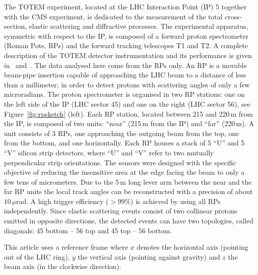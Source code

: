 The TOTEM experiment, located at the LHC Interaction Point (IP) 5 together with
the CMS experiment, is dedicated to the measurement of the total 
cross-section, elastic scattering
and diffractive processes. The experimental
apparatus, symmetric with respect to the IP, is 
composed of a forward proton spectrometer (Roman Pots, RPs) and the 
forward tracking telescopes T1 and T2. 
A complete description of the TOTEM detector instrumentation 
and its performance is given in~\cite{totem-jinst} and~\cite{totem-ijmp}. 
The data analysed here come from the RPs only. An RP is a movable beam-pipe
insertion capable of approaching the LHC beam to a distance of less than a millimeter, in 
order to detect protons with scattering angles of only a few microradians. 
The proton spectrometer is organised in two RP stations: one on the left side of the IP 
(LHC sector 45) and one on the right (LHC sector 56), see Figure~\ref{fig:rpsketch} (left).
Each RP station, located between 215 and 220\,m from the IP, is composed of two 
units: ``near'' (215\,m from the IP) and ``far'' (220\,m). 
A unit consists of 3 RPs, one
approaching the outgoing beam from the top, one from the bottom, and one 
horizontally.
Each RP houses a stack of 5 ``U'' and 5 ``V'' silicon strip detectors, where ``U'' and ``V''
refer to two mutually perpendicular strip orientations. The sensors were designed with the
specific objective of reducing the insensitive area at the edge facing the beam
to only a few tens of micrometers. Due to the 5\,m long lever arm 
between the near and the far RP units 
the local track angles can be reconstructed
with a precision of about $10\,\mu$rad. A high trigger efficiency
($> 99$\%) is achieved by using all RPs independently. 
Since elastic scattering events consist of two collinear protons emitted in 
opposite directions, the detected events can have two topologies, called 
diagonals: 45 bottom -- 56 top and 45 top -- 56 bottom.

This article uses a reference frame where $x$ denotes the horizontal axis (pointing out of the LHC ring), $y$ the vertical axis (pointing against gravity) and $z$ the beam axis (in the clockwise direction).
